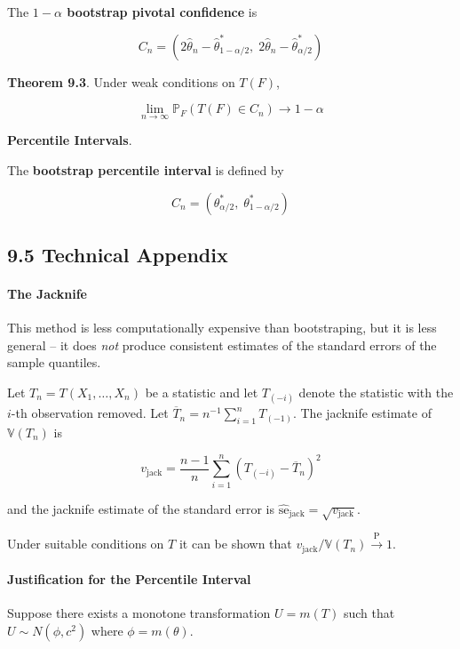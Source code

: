 The \textbf{\(1 - \alpha\) bootstrap pivotal confidence} is

\[ C_n = \left(2 \hat{\theta}_n - \hat{\theta}_{1 - \alpha/2}^*, \; 2 \hat{\theta}_n - \hat{\theta}_{\alpha/2}^* \right) \]

\textbf{Theorem 9.3}. Under weak conditions on \(T(F)\),

\[ \lim _{n \rightarrow \infty} \mathbb{P}_F\left(T(F) \in C_n\right) \rightarrow 1 - \alpha\]

\textbf{Percentile Intervals}.

The \textbf{bootstrap percentile interval} is defined by

\[ C_n = \left( \theta_{\alpha/2}^*, \; \theta_{1 - \alpha/2}^*\right) \]

\subsection{9.5 Technical Appendix}\label{technical-appendix}

\paragraph{The Jacknife}\label{the-jacknife}

This method is less computationally expensive than bootstraping, but it
is less general -- it does \emph{not} produce consistent estimates of
the standard errors of the sample quantiles.

Let \(T_n = T(X_1, \dots, X_n)\) be a statistic and let \(T_{(-i)}\)
denote the statistic with the \(i\)-th observation removed. Let
\(\overline{T}_n = n^{-1} \sum_{i=1}^n T_{(-1)}\). The jacknife estimate
of \(\mathbb{V}(T_n)\) is

\[ v_\text{jack} = \frac{n - 1}{n} \sum_{i=1}^n \left(T_{(-i)} - \overline{T}_n \right)^2 \]

and the jacknife estimate of the standard error is
\(\hat{\text{se}}_\text{jack} = \sqrt{v_\text{jack}}\).

Under suitable conditions on \(T\) it can be shown that
\(v_\text{jack} / \mathbb{V}(T_n) \xrightarrow{\text{P}} 1\).

\paragraph{Justification for the Percentile
Interval}\label{justification-for-the-percentile-interval}

Suppose there exists a monotone transformation \(U = m(T)\) such that
\(U \sim N(\phi, c^2)\) where \(\phi = m(\theta)\).

